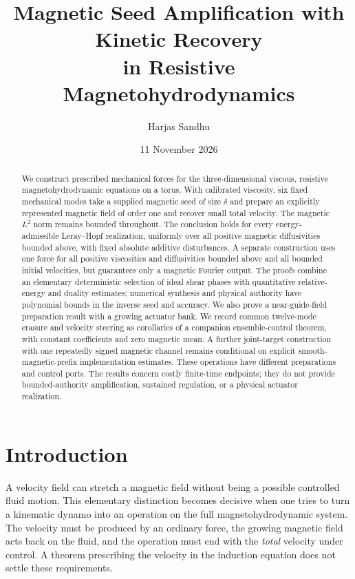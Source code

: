 \documentclass[11pt,a4paper]{amsart}
\title[Magnetic seed amplification and kinetic recovery]{Magnetic Seed Amplification with Kinetic Recovery\\ in Resistive Magnetohydrodynamics}
\author{Harjas Sandhu}
\date{11 November 2026}
\theoremstyle{definition}
\theoremstyle{remark}
\numberwithin{equation}{section}
\begin{document}
\begin{abstract}
We construct prescribed mechanical forces for the three-dimensional viscous, resistive magnetohydrodynamic equations on a torus. With calibrated viscosity, six fixed mechanical modes take a supplied magnetic seed of size $\delta$ and prepare an explicitly represented magnetic field of order one and recover small total velocity. The magnetic $L^2$ norm remains bounded throughout. The conclusion holds for every energy-admissible Leray--Hopf realization, uniformly over all positive magnetic diffusivities bounded above, with fixed absolute additive disturbances. A separate construction uses one force for all positive viscosities and diffusivities bounded above and all bounded initial velocities, but guarantees only a magnetic Fourier output. The proofs combine an elementary deterministic selection of ideal shear phases with quantitative relative-energy and duality estimates; numerical synthesis and physical authority have polynomial bounds in the inverse seed and accuracy. We also prove a near-guide-field preparation result with a growing actuator bank. We record common twelve-mode erasure and velocity steering as corollaries of a companion ensemble-control theorem, with constant coefficients and zero magnetic mean. A further joint-target construction with one repeatedly signed magnetic channel remains conditional on explicit smooth-magnetic-prefix implementation estimates. These operations have different preparations and control ports. The results concern costly finite-time endpoints; they do not provide bounded-authority amplification, sustained regulation, or a physical actuator realization.
\end{abstract}
\maketitle

\section{Introduction}

A velocity field can stretch a magnetic field without being a possible controlled fluid motion. This elementary distinction becomes decisive when one tries to turn a kinematic dynamo into an operation on the full magnetohydrodynamic system. The velocity must be produced by an ordinary force, the growing magnetic field acts back on the fluid, and the operation must end with the \emph{total} velocity under control. A theorem prescribing the velocity in the induction equation does not settle these requirements.
\end{document}
